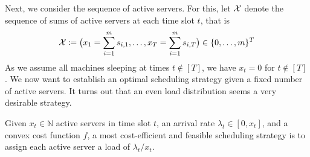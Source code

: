 Next, we consider the sequence of active servers. For this, let $\mathcal{X}$ denote the sequence of sums of active servers at each time slot $t$, that is
\begin{equation*}
	\mathcal{X}\coloneqq\bigl(x_1=\sum\limits_{i=1}^{m}s_{i,1},\ldots,x_T=\sum\limits_{i=1}^{m}s_{i,T}\bigr)\in\{0,\ldots,m\}^T
\end{equation*}
As we assume all machines sleeping at times $t\notin[T]$, we have $x_t=0$ for $t\notin[T]$. We now want to establish an optimal scheduling strategy given a fixed number of active servers. It turns out that an even load distribution seems a very desirable strategy.\begin{prop}\label{prop:even_load_distribution}
Given $x_t\in\mathbb{N}$ active servers in time slot $t$, an arrival rate $\lambda_t\in[0,x_t]$, and a convex cost function $f$, a most cost-efficient and feasible scheduling strategy is to assign each active server a load of $\lambda_t/x_t$.
\end{prop}
